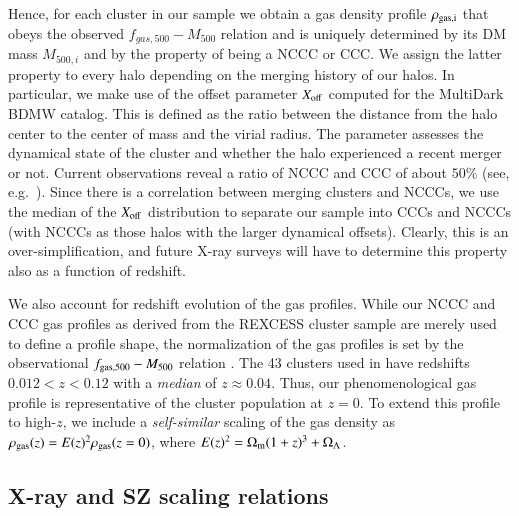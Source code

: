 \documentclass[traditabstract]{aa}
\begin{document}
Hence, for each cluster in our sample we obtain a gas density profile
$\rho_{\rm{gas},i}$ that obeys the observed $f_{gas,500}-M_{500}$ relation and
is uniquely determined by its DM mass $M_{500,i}$ and by the property of being a
NCCC or CCC. We assign the latter property to every halo depending on the
merging history of our halos. In particular, we make use of the offset parameter
$X_{\rm{off}}$ computed for the MultiDark BDMW catalog. This is defined as the
ratio between the distance from the halo center to the center of mass and the
virial radius. The parameter assesses the dynamical state of the cluster and
whether the halo experienced a recent merger or not. Current observations reveal
a ratio of NCCC and CCC of about $50\%$ (see, e.g.~\citealp{2007A&A...466..805C,
  2009MNRAS.395..764S}). Since there is a correlation between merging clusters
and NCCCs, we use the median of the $X_{\rm{off}}$ distribution to separate our
sample into CCCs and NCCCs (with NCCCs as those halos with the larger dynamical
offsets). Clearly, this is an over-simplification, and future X-ray surveys will
have to determine this property also as a function of redshift.

We also account for redshift evolution of the gas profiles. While our NCCC and
CCC gas profiles as derived from the REXCESS cluster sample are merely used to
define a profile shape, the normalization of the gas profiles is set by the
observational $f_{\rm{gas},500}-M_{500}$ relation \citep{2009ApJ...693.1142S}.
The 43 clusters used in \cite{2009ApJ...693.1142S} have redshifts $0.012 < z <
0.12$ with a \emph{median} of $z \approx 0.04$. Thus, our phenomenological gas
profile is representative of the cluster population at $z=0$. To extend this
profile to high-$z$, we include a \emph{self-similar} scaling of the gas density
as $\rho_{\rm{gas}}(z) = E(z)^{2} \rho_{\rm{gas}}(z=0)$, where $E(z)^{2} =
\Omega_{\rm{m}} (1+z)^{3} + \Omega_{{\Lambda}}$.


\subsection{X-ray and SZ scaling relations}
\end{document}
